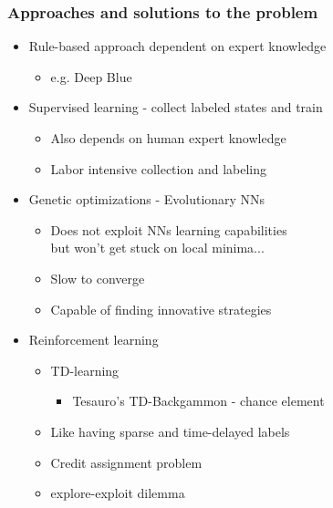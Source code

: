 \documentclass{beamer}
\begin{document}
\begin{frame}
\frametitle{Approaches and solutions to the problem}
\begin{itemize}
\item<1->Rule-based approach dependent on expert knowledge
\begin{itemize}
\item<2>e.g. Deep Blue
\end{itemize}
\item<3->Supervised learning - collect labeled states and train
\begin{itemize}
\item<4,5>Also depends on human expert knowledge
\item<5>Labor intensive collection and labeling
\end{itemize}
\item<6->Genetic optimizations - Evolutionary NNs
\begin{itemize}
\item<7,8>Does not exploit NNs learning capabilities\\ but won't get stuck on local minima...
\item<8>Slow to converge
\item<9>Capable of finding innovative strategies \cite{Moriarty93evolvingcomplex} \cite{chellapilla1999evolution}
\end{itemize}
\item<10->Reinforcement learning
\begin{itemize}
\item<11,12,13,14,15>TD-learning 
	\begin{itemize}
	\item<12>Tesauro's TD-Backgammon - chance element
	\end{itemize}
\item<13,14,15>Like having sparse and time-delayed labels
\item<14,15>Credit assignment problem
\item<15>explore-exploit dilemma
\end{itemize}
\end{itemize}
\end{frame}
\end{document}
